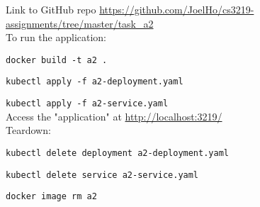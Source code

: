 \documentclass{article}
\begin{document}
    Link to GitHub repo \href{https://github.com/JoelHo/cs3219-assignments/tree/master/task_a2}{https://github.com/JoelHo/cs3219-assignments/tree/master/task\_a2}\\

    To run the application:

    \texttt{docker build -t a2 .}

    \texttt{kubectl apply -f a2-deployment.yaml}

    \texttt{kubectl apply -f a2-service.yaml}\\

    Access the "application" at \href{http://localhost:3219/}{http://localhost:3219/}\\

    Teardown:

    \texttt{kubectl delete deployment a2-deployment.yaml}

    \texttt{kubectl delete service a2-service.yaml}

    \texttt{docker image rm a2}\\
\end{document}
